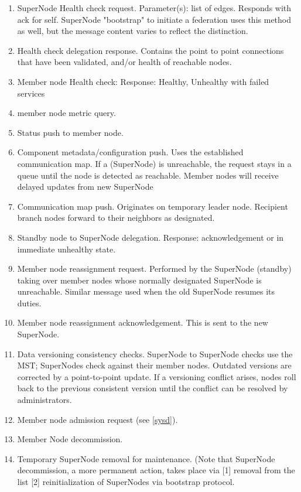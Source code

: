 \documentclass[oneside,12pt]{memoir}
\begin{document}
\begin{enumerate}
\item
SuperNode Health check request.  Parameter(s): list of edges.  Responds with ack for self.  SuperNode "bootstrap" to initiate a federation uses this method as well, but the message content varies to reflect the distinction. 

\item
Health check delegation response.  Contains the point to point connections that have been validated, and/or health of reachable nodes.

\item
Member node Health check:  Response: Healthy, Unhealthy with failed services
\item
member node metric query.
\item
Status push to member node.
\item
Component metadata/configuration push.  Uses the established communication map.  If a (SuperNode) is unreachable, the request stays in a queue until the node is detected as reachable.  Member nodes will receive delayed updates from new SuperNode
\item
Communication map push.  Originates on temporary leader node.  Recipient branch nodes forward to their neighbors as designated.
\item
Standby node to SuperNode delegation.  Response: acknowledgement or in immediate unhealthy state.
\item
Member node reassignment request.  Performed by the SuperNode (standby) taking over member nodes whose normally designated SuperNode is unreachable.   Similar message used when the old SuperNode resumes its duties.
\item
Member node reassignment acknowledgement.  This is sent to the new SuperNode.
\item
Data versioning consistency checks.  SuperNode to SuperNode checks use the MST; SuperNodes check against their member nodes. Outdated versions are corrected by a point-to-point update.  If a versioning conflict arises, nodes roll back to the previous consistent version until the conflict can be resolved by administrators.
\item
Member node admission request (see \ref{sysd}).   
\item
Member Node decommission. 
\item 
Temporary SuperNode removal for maintenance.  (Note that SuperNode decommission, a more permanent action, takes place via [1] removal from the list [2] reinitialization of SuperNodes via bootstrap protocol.

\end{enumerate}
\end{document}
